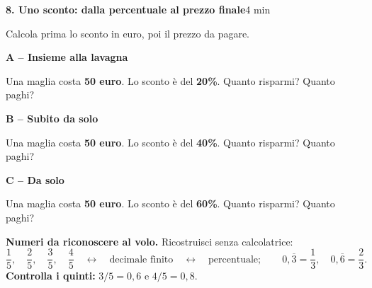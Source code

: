 \documentclass[11pt,a4paper]{article}
\newcommand{\blocco}[3]{\par\medskip\noindent\textbf{#1. #2}\hfill{\small #3 min}\par\nopagebreak}
\newcommand{\terna}[3]{%
\par\smallskip\noindent
\begin{minipage}[t]{.323\textwidth}\raggedright
\textbf{\small A -- Insieme alla lavagna}\par\smallskip #1
\end{minipage}\hfill
\begin{minipage}[t]{.323\textwidth}\raggedright
\textbf{\small B -- Subito da solo}\par\smallskip #2
\end{minipage}\hfill
\begin{minipage}[t]{.323\textwidth}\raggedright
\textbf{\small C -- Da solo}\par\smallskip #3
\end{minipage}\par}
\begin{document}
\vspace{4mm}
\blocco{8}{Uno sconto: dalla percentuale al prezzo finale}{4}
Calcola prima lo sconto in euro, poi il prezzo da pagare.
\terna{
Una maglia costa \textbf{50 euro}. Lo sconto è del \textbf{20\%}. Quanto risparmi? Quanto paghi?
}{
Una maglia costa \textbf{50 euro}. Lo sconto è del \textbf{40\%}. Quanto risparmi? Quanto paghi?
}{
Una maglia costa \textbf{50 euro}. Lo sconto è del \textbf{60\%}. Quanto risparmi? Quanto paghi?
}

\vfill
\textbf{Numeri da riconoscere al volo.} Ricostruisci senza calcolatrice:
\[
\frac15,\quad\frac25,\quad\frac35,\quad\frac45
\quad\longleftrightarrow\quad
\text{decimale finito}\quad\longleftrightarrow\quad\text{percentuale};
\qquad
0{,}\overline3=\frac13,\quad 0{,}\overline6=\frac23.
\]
\textbf{Controlla i quinti:} $3/5=0{,}6$ e $4/5=0{,}8$.
\end{document}
